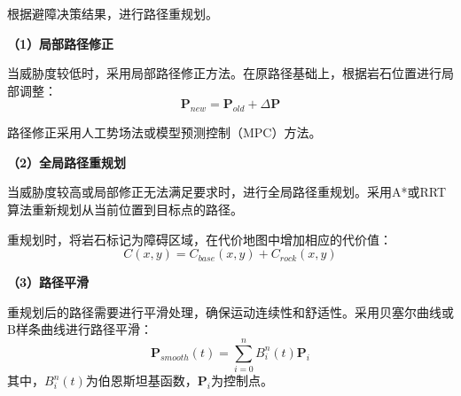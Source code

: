 根据避障决策结果，进行路径重规划。

\textbf{（1）局部路径修正}

当威胁度较低时，采用局部路径修正方法。在原路径基础上，根据岩石位置进行局部调整：
\begin{equation}
    \mathbf{P}_{new} = \mathbf{P}_{old} + \Delta\mathbf{P}
    \label{eq:path_modify}
\end{equation}

路径修正采用人工势场法或模型预测控制（MPC）方法。

\textbf{（2）全局路径重规划}

当威胁度较高或局部修正无法满足要求时，进行全局路径重规划。采用A*或RRT算法重新规划从当前位置到目标点的路径。

重规划时，将岩石标记为障碍区域，在代价地图中增加相应的代价值：
\begin{equation}
    C(x, y) = C_{base}(x, y) + C_{rock}(x, y)
    \label{eq:cost_update}
\end{equation}

\textbf{（3）路径平滑}

重规划后的路径需要进行平滑处理，确保运动连续性和舒适性。采用贝塞尔曲线或B样条曲线进行路径平滑：
\begin{equation}
    \mathbf{P}_{smooth}(t) = \sum_{i=0}^{n} B_i^n(t) \mathbf{P}_i
    \label{eq:path_smooth}
\end{equation}
其中，$B_i^n(t)$为伯恩斯坦基函数，$\mathbf{P}_i$为控制点。
